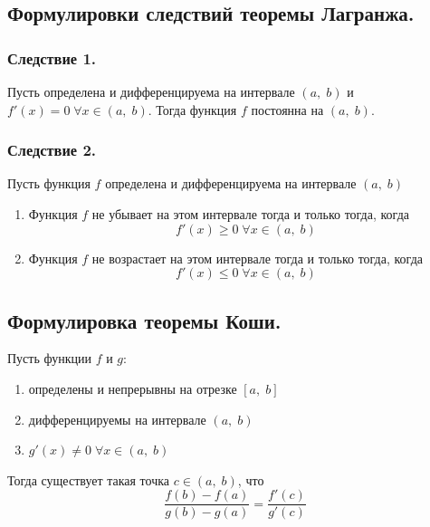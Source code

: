 

\label{sec_Definition13}
\begin{definition}
    \subsection*{Формулировки следствий теоремы Лагранжа.}
    \begin{note}[amber]
        \subsubsection*{Следствие 1.}
        \begin{note}[purple]
            Пусть определена и дифференцируема на интервале $(a, \; b)$
            и $f'(x) = 0 \; \forall x \in (a, \; b)$. Тогда функция $f$ постоянна на $(a, \; b)$. 
        \end{note}

        \subsubsection*{Следствие 2.}
        \begin{note}[purple]
            Пусть функция $f$ определена и дифференцируема на интервале $(a, \; b)$
            \begin{enumerate}
                \item Функция $f$ не убывает на этом интервале тогда и только тогда, 
                когда $$ f'(x) \geq 0 \; \forall x \in (a, \; b) $$
                \item Функция $f$ не возрастает на этом интервале тогда и только тогда, 
                когда $$ f'(x) \leq 0 \; \forall x \in (a, \; b) $$
            \end{enumerate}
        \end{note}
    \end{note}

    \subsection*{Формулировка теоремы Коши.}
    \begin{note}[purple]
        Пусть функции $f$ и $g$:
        \begin{enumerate}
            \item определены и непрерывны на отрезке $[a,\; b]$
            \item дифференцируемы на интервале $(a, \; b)$
            \item $g'(x) \neq 0 \; \forall x \in (a, \; b)$
        \end{enumerate}
        Тогда существует такая точка $c \in (a, \; b)$, что 
        $$ \frac{f(b) - f(a)}{g(b) - g(a)} = \frac{f'(c)}{g'(c)} $$
    \end{note}
\end{definition}